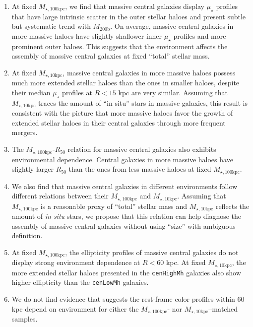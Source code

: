\documentclass[a4paper,fleqn,usenatbib]{mnras}
\def\rbcg{\texttt{cenHighMh}}
\def\nbcg{\texttt{cenLowMh}}
\def\mhalo{{$M_{\mathrm{200b}}$}}
\def\minn{{$M_{\star,10\mathrm{kpc}}$}}
\def\mtot{{$M_{\star,100\mathrm{kpc}}$}}
\def\mden{{$\mu_{\star}$}}
\begin{document}
    \begin{enumerate}
    
        \item At fixed \mtot{}, we find that massive central galaxies display \mden{} 
            profiles that have large intrinsic scatter in the outer stellar haloes and 
            present subtle but systematic trend with \mhalo{}.
            On average, massive central galaxies in more massive haloes have slightly 
            shallower inner \mden{} profiles and more prominent outer haloes. 
            This suggests that the environment affects the assembly of massive central
            galaxies at fixed ``total'' stellar mass.
            
        \item At fixed \minn{}, massive central galaxies in more massive haloes 
            possess much more extended stellar haloes than the ones in smaller haloes, 
            despite their median \mden{} profiles at $R < 15$ kpc are very similar. 
            Assuming that \minn{} traces the amount of ``in situ'' stars in massive
            galaxies, this result is consistent with the picture that more massive 
            haloes favor the growth of extended stellar haloes in their central 
            galaxies through more frequent mergers. 
        
        \item The \mtot{}-$R_{\mathrm{50}}$ relation for massive central galaxies 
            also exhibits environmental dependence. 
            Central galaxies in more massive haloes have slightly larger
            $R_{\mathrm{50}}$ than the ones from less massive haloes at fixed \mtot{}. 
        
        \item We also find that massive central galaxies in different environments
            follow different relations between their \mtot{} and \minn{}. 
            Assuming that \mtot{} is a reasonable proxy of ``total'' stellar mass and 
            \minn{} reflects the amount of \textit{in situ} stars, we propose that 
            this relation can help diagnose the assembly of massive central galaxies 
            without using ``size'' with ambiguous definition. 
        
        \item At fixed \mtot{}, the ellipticity profiles of massive central galaxies 
            do not display strong environment dependence at $R < 60$ kpc. 
            At fixed \minn{}, the more extended stellar haloes presented in the \rbcg{}
            galaxies also show higher ellipticity than the \nbcg{} galaxies. 
        
        \item We do not find evidence that suggests the rest-frame color profiles 
            within 60 kpc depend on environment for either the \mtot{}- nor 
            \minn{}--matched samples. 
             
    \end{enumerate}
    
\end{document}
